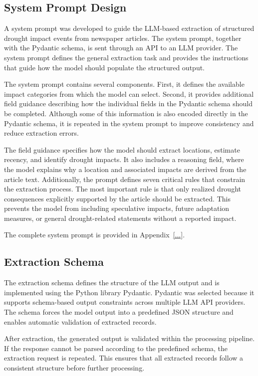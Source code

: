 
\subsection{System Prompt Design}
A system prompt was developed to guide the LLM-based extraction of structured drought impact events from newspaper articles. The system prompt, together with the Pydantic schema, is sent through an API to an LLM provider. The system prompt defines the general extraction task and provides the instructions that guide how the model should populate the structured output.

The system prompt contains several components. First, it defines the available impact categories from which the model can select. Second, it provides additional field guidance describing how the individual fields in the Pydantic schema should be completed. Although some of this information is also encoded directly in the Pydantic schema, it is repeated in the system prompt to improve consistency and reduce extraction errors.

The field guidance specifies how the model should extract locations, estimate recency, and identify drought impacts. It also includes a reasoning field, where the model explains why a location and associated impacts are derived from the article text. Additionally, the prompt defines seven critical rules that constrain the extraction process. The most important rule is that only realized drought consequences explicitly supported by the article should be extracted. This prevents the model from including speculative impacts, future adaptation measures, or general drought-related statements without a reported impact.

The complete system prompt is provided in Appendix~\ref{...}.

\subsection{Extraction Schema}

The extraction schema defines the structure of the LLM output and is implemented using the Python library Pydantic. Pydantic was selected because it supports schema-based output constraints across multiple LLM API providers. The schema forces the model output into a predefined JSON structure and enables automatic validation of extracted records.

After extraction, the generated output is validated within the processing pipeline. If the response cannot be parsed according to the predefined schema, the extraction request is repeated. This ensures that all extracted records follow a consistent structure before further processing.

